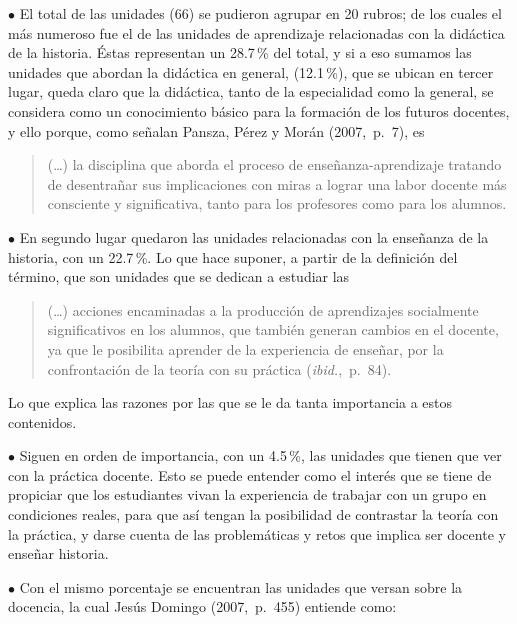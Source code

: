 \bigskip 
\begin{Obs} 
\item[$\bullet$] El total de las unidades (66) 
se pudieron agrupar en 20 rubros; de los cuales el más numeroso 
fue el de las unidades de aprendizaje relacionadas con la didáctica de 
la historia. Éstas representan un 28.7\,\% del total, y si a eso 
sumamos las unidades que abordan la didáctica en  general,  (12.1\,\%), 
que se ubican en tercer lugar,  queda claro que la didáctica, tanto de 
la especialidad como la general, se considera como un conocimiento 
básico para la formación de los futuros docentes, y ello porque, como 
señalan Pansza, Pérez y Morán (2007,~p.~7), es 
\begin{quotation}
(\ldots) la disciplina que aborda el proceso de 
enseñanza-aprendizaje tratando de desentrañar sus implicaciones con 
miras a lograr una labor docente más consciente y significativa, tanto 
para los profesores como para los alumnos.  
\end{quotation}
\item[$\bullet$] En segundo lugar quedaron las unidades relacionadas 
con la enseñanza de la historia, con un 22.7\,\%. Lo que hace suponer, a 
partir de la definición del término, que son unidades que se dedican a 
estudiar las 

\begin{quotation} 
(\ldots) acciones encaminadas a la producción de aprendizajes 
socialmente significativos en los alumnos, que también generan cambios 
en el docente, ya que le posibilita aprender de la experiencia de 
enseñar, por la confrontación de la teoría con su práctica (\textit{ibid.},~p.~84). 
\end{quotation} 

\enlargethispage{1\baselineskip}
Lo que explica las razones por las que se le da tanta importancia 
a estos contenidos.

\item[$\bullet$] Siguen en orden de importancia, con un 4.5\,\%, las 
unidades que tienen que ver con la práctica docente. Esto se puede 
entender como el interés que se tiene de propiciar que los estudiantes 
vivan la experiencia de trabajar con un grupo en condiciones reales, 
para que así tengan la posibilidad de contrastar la teoría con la 
práctica, y darse cuenta de las problemáticas y retos que implica ser 
docente y enseñar historia.
\item[$\bullet$]  Con el mismo porcentaje se encuentran las unidades 
que versan sobre la  docencia, la cual Jesús Domingo (2007,~p.~455) entiende como: 
\end{Obs}

